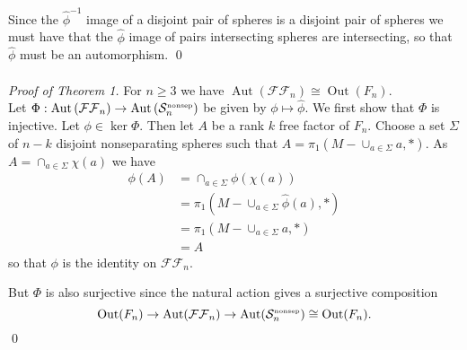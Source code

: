 \documentclass[11pt]{article}
\newcommand{\nosep}{{\ensuremath{ \mathcal S^{\mbox{\tiny{nonsep}}}_n }}}
\newcommand{\ffn}{{\ensuremath{ \mathcal {FF}_n }}}
\DeclareMathOperator{\oout}{Out}
\DeclareMathOperator{\aaut}{Aut}
\begin{document}
Since the $\hat \phi^{-1}$ image of a disjoint pair of spheres is a disjoint pair of spheres we must have that  the $\hat \phi$ image of pairs intersecting spheres are intersecting, so that $\hat \phi$ must be an automorphism.
\qed \\
\\
\noindent \emph{Proof of Theorem 1.} For $n\geq 3$ we have $\aaut (\ffn) \cong \oout( F_n)$.
\\
Let $\Phi: \aaut \left ( \ffn \right ) \to  \aaut \left ( \nosep \right )$ be given by $\phi \mapsto \hat \phi$.
We first show that $\Phi$ is injective.
Let $\phi \in \ker \Phi$.
Then let $A$ be a rank $k$ free factor of $F_n$.
Choose a set $\Sigma$ of $n-k$ disjoint nonseparating spheres such that $A=\pi_1 (M-\cup_{a \in \Sigma} a,\ast)$.
As $A= \cap_{a \in \Sigma} \chi (a)$ we have
\begin{align*}
\phi(A) &=  \cap_{a \in \Sigma}  \phi (\chi (a)) \\
&= \pi_1 (M- \cup_{a \in \Sigma} \hat \phi(a), \ast)\\
&= \pi_1 (M- \cup_{a \in \Sigma} a, \ast )\\
&=A
\end{align*}
so that $\phi$ is the identity on $\ffn$.

But $\Phi$ is also surjective since the natural action gives a surjective composition
$$
\oout (F_n) \to \aaut ( \ffn ) \to \aaut (\nosep) \cong \oout(F_n).
$$
\qed

\nocite{*}

{}

\end{document}
